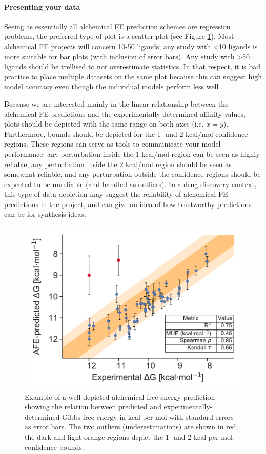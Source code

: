 \documentclass[9pt,bestpractices]{livecoms}
\begin{document}
\paragraph{Presenting your data}
Seeing as essentially all alchemical FE prediction schemes are regression problems, the preferred type of plot is a scatter plot (see Figure \ref{fig:scatterplot_analysis}). Most alchemical FE projects will concern 10-50 ligands; any study with \textless10 ligands is more suitable for bar plots (with inclusion of error bars). Any study with \textgreater50 ligands should be trellised to not overestimate statistics. In that respect, it is bad practice to place multiple datasets on the same plot because this can suggest high model accuracy even though the individual models perform less well \cite{cite blogpost Pat Walters}.

Because we are interested mainly in the linear relationship between the alchemical FE predictions and the experimentally-determined affinity values, plots should be depicted with the same range on both axes (i.e. $x=y$). Furthermore, bounds should be depicted for the 1- and 2-kcal/mol confidence regions. These regions can serve as tools to communicate your model performance: any perturbation inside the 1 kcal/mol region can be seen as highly reliable, any perturbation inside the 2 kcal/mol region should be seen as somewhat reliable, and any perturbation outside the confidence regions should be expected to be unreliable (and handled as outliers). In a drug discovery context, this type of data depiction may suggest the reliability of alchemical FE predictions in the project, and can give an idea of how trustworthy predictions can be for synthesis ideas. 
\begin{figure}
    \includegraphics[width=0.95\linewidth]{figures/fig13_analysis_practices/Figure.pdf}
    \caption{Example of a well-depicted alchemical free energy prediction showing the relation between predicted and experimentally-determined Gibbs free energy in kcal per mol with standard errors as error bars. The two outliers (underestimations) are shown in red; the dark and light-orange regions depict the 1- and 2-kcal per mol confidence bounds.}
    \label{fig:scatterplot_analysis}
\end{figure}
\end{document}
